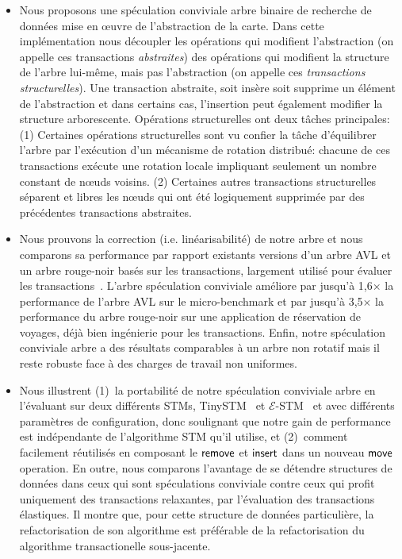\begin{itemize}

\item Nous proposons une spéculation conviviale arbre binaire de recherche de données   mise en œuvre de l'abstraction de la carte.
Dans cette implémentation nous découpler les opérations qui modifient l'abstraction
(on appelle ces transactions \emph{abstraites}) des opérations qui modifient la structure de l'arbre lui-même, mais pas l'abstraction (on appelle ces \emph{transactions structurelles}).
Une transaction abstraite, soit insère soit supprime un élément de l'abstraction et dans certains cas, l'insertion peut également modifier la structure arborescente.
Opérations structurelles ont deux tâches principales:
(1) Certaines opérations structurelles sont vu confier la tâche d'équilibrer l'arbre par l'exécution d'un mécanisme de rotation distribué:
chacune de ces transactions exécute une rotation locale impliquant seulement un nombre constant de nœuds voisins.
(2) Certaines autres transactions structurelles séparent et libres les nœuds qui ont été logiquement supprimée par des précédentes transactions abstraites.



\item Nous prouvons la correction (i.e. linéarisabilité) de notre arbre et nous comparons sa performance par rapport existants versions d'un arbre AVL
et un arbre rouge-noir basés sur les transactions, largement utilisé pour évaluer les transactions~\cite{DSS06, HLMS03, CCKO08, HK08, FFR08, YNW+08, DFGG11}.
L'arbre spéculation conviviale améliore par jusqu'à 1,6$\times$ la performance de l'arbre AVL sur le micro-benchmark et par jusqu'à 3,5$\times$ la performance du arbre rouge-noir sur
une application de réservation de voyages, déjà bien ingénierie pour les transactions.
Enfin, notre spéculation conviviale arbre a des résultats comparables à un arbre non rotatif mais il reste robuste face à des charges de travail non uniformes.



\item Nous illustrent (1)~la portabilité de notre spéculation conviviale arbre en l'évaluant sur deux différents STMs, TinySTM~\cite{FFR08} et $\mathcal{E}$-STM~\cite{FGG09}
et avec différents paramètres de configuration, donc soulignant que notre gain de performance est indépendante de l'algorithme STM qu'il utilise,
et (2)~comment facilement réutilisés en composant le $\lit{remove}$ et $\lit{insert}$ dans un nouveau $\lit{move}$ operation.
En outre, nous comparons l'avantage de se détendre structures de données dans ceux qui sont spéculations conviviale contre ceux qui profit uniquement des transactions relaxantes, par l'évaluation des transactions élastiques.
Il montre que, pour cette structure de données particulière, la refactorisation de son algorithme est préférable de la refactorisation du algorithme transactionelle sous-jacente.



\end{itemize}


